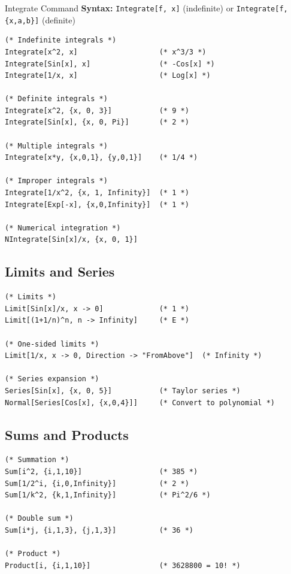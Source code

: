\documentclass[12pt,a4paper]{article}
\begin{document}
\begin{mainbox}{Integrate Command}
\textbf{Syntax:} \texttt{Integrate[f, x]} (indefinite) or \texttt{Integrate[f, \{x,a,b\}]} (definite)

\begin{lstlisting}
(* Indefinite integrals *)
Integrate[x^2, x]                   (* x^3/3 *)
Integrate[Sin[x], x]                (* -Cos[x] *)
Integrate[1/x, x]                   (* Log[x] *)

(* Definite integrals *)
Integrate[x^2, {x, 0, 3}]           (* 9 *)
Integrate[Sin[x], {x, 0, Pi}]       (* 2 *)

(* Multiple integrals *)
Integrate[x*y, {x,0,1}, {y,0,1}]    (* 1/4 *)

(* Improper integrals *)
Integrate[1/x^2, {x, 1, Infinity}]  (* 1 *)
Integrate[Exp[-x], {x,0,Infinity}]  (* 1 *)

(* Numerical integration *)
NIntegrate[Sin[x]/x, {x, 0, 1}]
\end{lstlisting}
\end{mainbox}

\subsection{Limits and Series}

\begin{commandbox}
\begin{lstlisting}
(* Limits *)
Limit[Sin[x]/x, x -> 0]             (* 1 *)
Limit[(1+1/n)^n, n -> Infinity]     (* E *)

(* One-sided limits *)
Limit[1/x, x -> 0, Direction -> "FromAbove"]  (* Infinity *)

(* Series expansion *)
Series[Sin[x], {x, 0, 5}]           (* Taylor series *)
Normal[Series[Cos[x], {x,0,4}]]     (* Convert to polynomial *)
\end{lstlisting}
\end{commandbox}

\subsection{Sums and Products}

\begin{commandbox}
\begin{lstlisting}
(* Summation *)
Sum[i^2, {i,1,10}]                  (* 385 *)
Sum[1/2^i, {i,0,Infinity}]          (* 2 *)
Sum[1/k^2, {k,1,Infinity}]          (* Pi^2/6 *)

(* Double sum *)
Sum[i*j, {i,1,3}, {j,1,3}]          (* 36 *)

(* Product *)
Product[i, {i,1,10}]                (* 3628800 = 10! *)
\end{lstlisting}
\end{commandbox}
\end{document}
